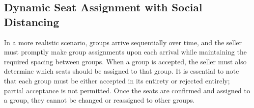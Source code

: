 





\subsection{Dynamic Seat Assignment with Social Distancing}\label{sec_dynamic_seat}
In a more realistic scenario, groups arrive sequentially over time, and the seller must promptly make group assignments upon each arrival while maintaining the required spacing between groups. When a group is accepted, the seller must also determine which seats should be assigned to that group. It is essential to note that each group must be either accepted in its entirety or rejected entirely; partial acceptance is not permitted. Once the seats are confirmed and assigned to a group, they cannot be changed or reassigned to other groups.

